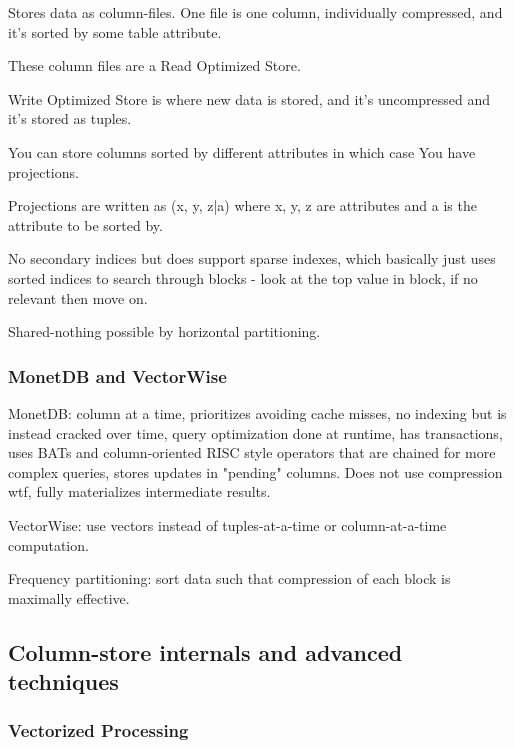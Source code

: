\documentclass{article}
\begin{document}
			Stores data as column-files. One file is one column, individually compressed, and it's sorted by some table attribute.
			
			These column files are a Read Optimized Store.
			
			Write Optimized Store is where new data is stored, and it's uncompressed and it's stored as tuples.
			
			You can store columns sorted by different attributes in which case You have projections.
			
			Projections are written as (x, y, z|a) where x, y, z are attributes and a is the attribute to be sorted by.
			
			No secondary indices but does support sparse indexes, which basically just uses sorted indices to search through blocks - look at the top value in block, if no relevant then move on.
			
			Shared-nothing possible by horizontal partitioning.
			
		\subsubsection{MonetDB and VectorWise}
		
			MonetDB: column at a time, prioritizes avoiding cache misses, no indexing but is instead cracked over time, query optimization done at runtime, has transactions, uses BATs and column-oriented RISC style operators that are chained for more complex queries, stores updates in "pending" columns. Does not use compression wtf, fully materializes intermediate results.
			
			VectorWise: use vectors instead of tuples-at-a-time or column-at-a-time computation.
			
			Frequency partitioning: sort data such that compression of each block is maximally effective.
			
			
			
			
			
			
			
	\subsection{Column-store internals and advanced techniques}
	
		\subsubsection{Vectorized Processing}
		
\end{document}
